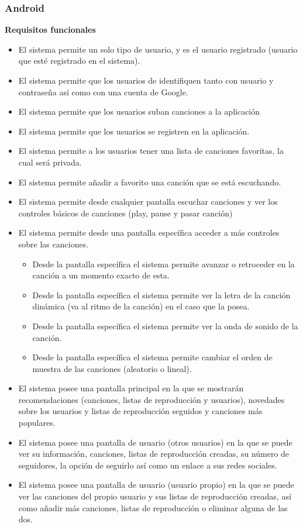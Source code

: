 \documentclass[12pt]{article}%
\begin{document}
\subsubsection{Android}

\textbf{Requisitos funcionales}
\begin{itemize}
	\item El sistema permite un solo tipo de usuario, y es el usuario registrado (usuario que esté registrado en el sistema).
	\item El sistema permite que los usuarios de identifiquen tanto con usuario y contraseña así como con una cuenta de Google.
	\item  El sistema permite que los usuarios suban canciones a la aplicación
	\item  El sistema permite que los usuarios se registren en la aplicación.
	\item  El sistema permite a los usuarios tener una lista de canciones favoritas, la cual será privada.
	\item  El sistema permite añadir a favorito una canción que se está escuchando.
	\item  El sistema permite desde cualquier pantalla escuchar canciones y ver los controles básicos de canciones (play, pause y pasar canción)
	\item  El sistema permite desde una pantalla específica acceder a más controles sobre las canciones.
	\begin{itemize}
		\item  Desde la pantalla específica el sistema permite avanzar o retroceder en la canción a un momento exacto de esta.
		\item  Desde la pantalla específica el sistema permite ver la letra de la canción dinámica (va al ritmo de la canción) en el caso que la posea.
		\item  Desde la pantalla específica el sistema permite ver la onda de sonido de la canción.
		\item  Desde la pantalla específica el sistema permite cambiar el orden de muestra de las canciones (aleatorio o lineal).
	\end{itemize}
	
	\item  El sistema posee una pantalla principal en la que se mostrarán recomendaciones (canciones, listas de reproducción y usuarios), novedades sobre los usuarios y listas de reproducción seguidos y canciones más populares. 
	\item  El sistema posee una pantalla de usuario (otros usuarios) en la que se puede ver su información, canciones, listas de reproducción creadas, su número de seguidores, la opción de seguirlo así como un enlace a sus redes sociales.
	\item  El sistema posee una pantalla de usuario (usuario propio) en la que se puede ver las canciones del propio usuario y sus listas de reproducción creadas, así como añadir más canciones, listas de reproducción o eliminar alguna de las dos.
	

\end{itemize}
\end{document}

